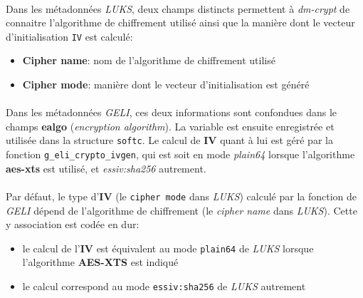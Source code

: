 \paragraph{}
Dans les métadonnées \textit{LUKS}, deux champs distincts permettent à
\textit{dm-crypt} de connaitre l'algorithme de chiffrement utilisé ainsi que la
manière dont le vecteur d'initialisation \texttt{IV} est calculé:
\begin{itemize}
\item \textbf{Cipher name}: nom de l'algorithme de chiffrement utilisé
\item \textbf{Cipher mode}: manière dont le vecteur d'initialisation est généré
\end{itemize}
\paragraph{}
Dans les métadonnées \textit{GELI}, ces deux informations sont confondues dans
le champs \textbf{ealgo} (\textit{encryption algorithm}). La variable est
ensuite enregistrée et utilisée dans la structure \texttt{softc}. Le calcul de
\textbf{IV} quant à lui est géré par la fonction \texttt{g\_eli\_crypto\_ivgen},
qui est soit en mode \textit{plain64} lorsque l'algorithme \textbf{aes-xts} est
utilisé, et \textit{essiv:sha256} autrement.
\paragraph{}
Par défaut, le type d'\textbf{IV} (le \texttt{cipher mode} dans \textit{LUKS})
calculé par la fonction de \textit{GELI} dépend de l'algorithme de chiffrement
(le \textit{cipher name} dans \textit{LUKS}). Cette y association est codée en
dur:
\begin{itemize}
\item le calcul de l'\textbf{IV} est équivalent au mode \texttt{plain64} de
  \textit{LUKS} lorsque l'algorithme \textbf{AES-XTS} est indiqué
\item le calcul correspond au mode \texttt{essiv:sha256} de \textit{LUKS}
  autrement
\end{itemize}
